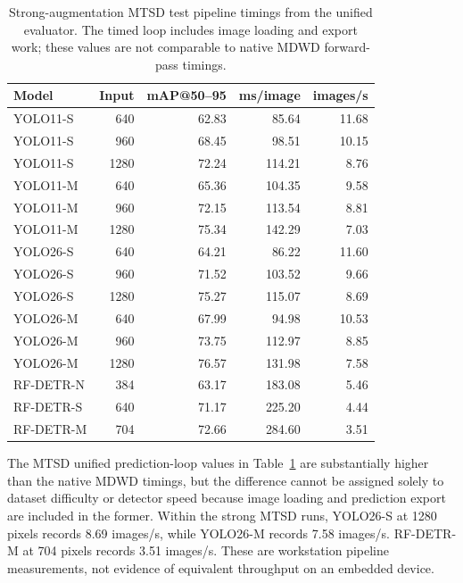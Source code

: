 \begin{table}[htbp]
\centering
\small
\caption{Strong-augmentation \gls{MTSD} test pipeline timings from the unified evaluator. The timed loop includes image loading and export work; these values are not comparable to native MDWD forward-pass timings.}
\label{tab:ev-mtsd-runtime}
\renewcommand{\arraystretch}{1.15}
\begin{tabularx}{\textwidth}{@{}>{\raggedright\arraybackslash}Xrrrr@{}}
\toprule
Model & Input & \gls{mAP}@50--95 & ms/image & images/s \\
\midrule
YOLO11-S & 640 & 62.83 & 85.64 & 11.68 \\
YOLO11-S & 960 & 68.45 & 98.51 & 10.15 \\
YOLO11-S & 1280 & 72.24 & 114.21 & 8.76 \\
YOLO11-M & 640 & 65.36 & 104.35 & 9.58 \\
YOLO11-M & 960 & 72.15 & 113.54 & 8.81 \\
YOLO11-M & 1280 & 75.34 & 142.29 & 7.03 \\
YOLO26-S & 640 & 64.21 & 86.22 & 11.60 \\
YOLO26-S & 960 & 71.52 & 103.52 & 9.66 \\
YOLO26-S & 1280 & 75.27 & 115.07 & 8.69 \\
YOLO26-M & 640 & 67.99 & 94.98 & 10.53 \\
YOLO26-M & 960 & 73.75 & 112.97 & 8.85 \\
YOLO26-M & 1280 & 76.57 & 131.98 & 7.58 \\
RF-DETR-N & 384 & 63.17 & 183.08 & 5.46 \\
RF-DETR-S & 640 & 71.17 & 225.20 & 4.44 \\
RF-DETR-M & 704 & 72.66 & 284.60 & 3.51 \\
\bottomrule
\end{tabularx}
\end{table}


The MTSD unified prediction-loop values in Table~\ref{tab:ev-mtsd-runtime} are substantially higher than the native MDWD timings, but the difference cannot be assigned solely to dataset difficulty or detector speed because image loading and prediction export are included in the former. Within the strong MTSD runs, YOLO26-S at 1280 pixels records 8.69 images/s, while YOLO26-M records 7.58 images/s. RF-DETR-M at 704 pixels records 3.51 images/s. These are workstation pipeline measurements, not evidence of equivalent throughput on an embedded device.

